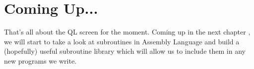\section{Coming Up...}
\label{ch8-the-end}%

That's all about the QL screen for the moment. Coming up in the next chapter
    , we will start to take a look at subroutines in Assembly Language and
    build a (hopefully) useful subroutine library which will allow us to
    include them in any new programs we write. 

